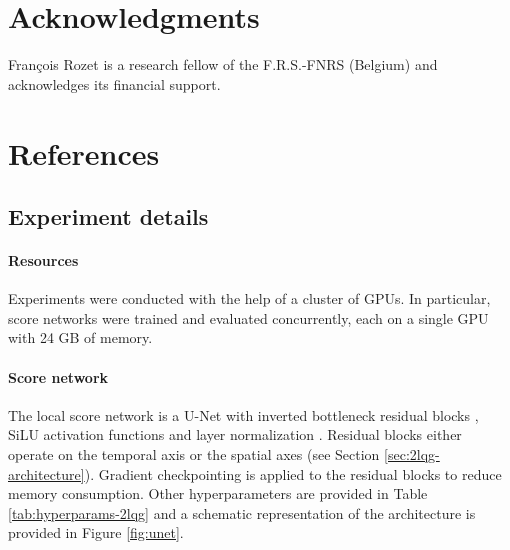 \section*{Acknowledgments}

François Rozet is a research fellow of the F.R.S.-FNRS (Belgium) and acknowledges its financial support.

\clearpage
\section*{References}

\printbibliography[heading=none]

\begin{subappendices}

\clearpage
\section{Experiment details} \label{app:2lqg-details}

\paragraph{Resources}
Experiments were conducted with the help of a cluster of GPUs. In particular, score networks were trained and evaluated concurrently, each on a single GPU with 24 GB of memory.

\paragraph{Score network}
The local score network is a U-Net \cite{ronneberger2015unet} with inverted bottleneck residual blocks \cite{he2016deep, sandler2018mobilenetv2, liu2022convnet}, SiLU \cite{elfwing2018sigmoidweighted} activation functions and layer normalization \cite{ba2016layer}. Residual blocks either operate on the temporal axis or the spatial axes (see Section \ref{sec:2lqg-architecture}). Gradient checkpointing \cite{chen2016training, gruslys2016memoryefficient} is applied to the residual blocks to reduce memory consumption. Other hyperparameters are provided in Table \ref{tab:hyperparams-2lqg} and a schematic representation of the architecture is provided in Figure \ref{fig:unet}.


\end{subappendices}
